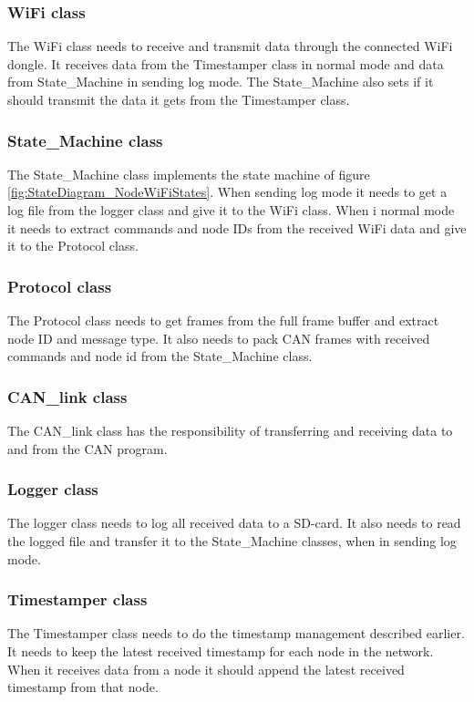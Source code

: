 \subsubsection*{WiFi class}
The WiFi class needs to receive and transmit data through the connected WiFi dongle.
It receives data from the Timestamper class in normal mode and data from State\_Machine in sending log mode.
The State\_Machine also sets if it should transmit the data it gets from the Timestamper class. 

\subsubsection*{State\_Machine class}
The State\_Machine class implements the state machine of figure \ref{fig:StateDiagram_NodeWiFiStates}.
When sending log mode it needs to get a log file from the logger class and give it to the WiFi class.
When i normal mode it needs to extract commands and node IDs from the received WiFi data and give it to the Protocol class.

\subsubsection*{Protocol class}
The Protocol class needs to get frames from the full frame buffer and extract node ID and message type. 
It also needs to pack CAN frames with received commands and node id from the State\_Machine class.

\subsubsection*{CAN\_link class}
The CAN\_link class has the responsibility of transferring and receiving data to
and from the CAN program.

\subsubsection*{Logger class}
The logger class needs to log all received data to a SD-card.
It also needs to read the logged file and transfer it to the State\_Machine classes, when in sending log mode.

\subsubsection*{Timestamper class}
The Timestamper class needs to do the timestamp management described earlier.
It needs to keep the latest received timestamp for each node in the network.
When it receives data from a node it should append the latest received timestamp from that node.  